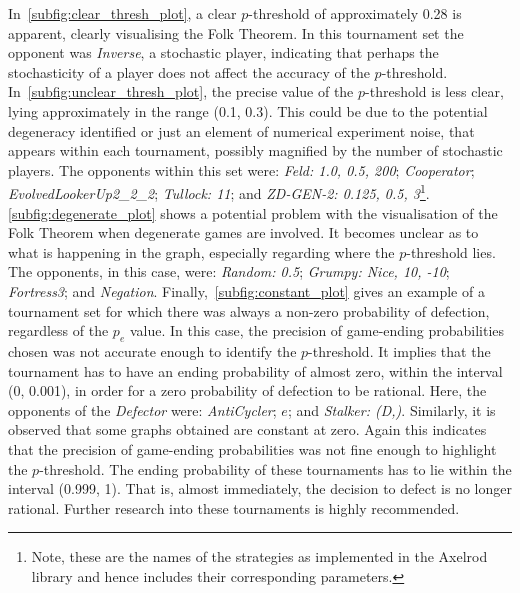 In~\autoref{subfig:clear_thresh_plot}, a clear \(p\)-threshold of approximately
0.28 is apparent, clearly visualising the Folk Theorem. In this tournament set
the opponent was \textit{Inverse}, a stochastic player, indicating that perhaps
the stochasticity of a player does not affect the accuracy of the \(p\)-threshold. In~\autoref{subfig:unclear_thresh_plot}, the precise value of
the \(p\)-threshold is less clear, lying approximately in the range (0.1, 0.3). This
could be due to the potential degeneracy identified or just an element of
numerical experiment noise,
that appears within each tournament, possibly magnified by the number
of stochastic players. The opponents within this set
were: \textit{Feld: 1.0, 0.5, 200}; \textit{Cooperator};
\textit{EvolvedLookerUp2\_2\_2}; \textit{Tullock: 11}; and \textit{ZD-GEN-2:
0.125, 0.5, 3}\footnote{Note, these are the names of the strategies as
implemented in the Axelrod library and hence includes their corresponding parameters.}. \autoref{subfig:degenerate_plot} shows a potential problem
with the visualisation of the Folk Theorem when degenerate games are involved.
It becomes unclear as to what is happening in the graph,
especially regarding where the \(p\)-threshold lies. The opponents, in this case, were:
\textit{Random: 0.5}; \textit{Grumpy: Nice, 10, -10}; \textit{Fortress3}; and
\textit{Negation}. Finally,~\autoref{subfig:constant_plot} gives an example
of a tournament set for which there was always a non-zero probability of
defection, regardless of the \(p_{e}\) value. In this case, the
precision of game-ending probabilities chosen was not accurate enough to
identify the \(p\)-threshold. It implies that the tournament has to have an
ending probability of almost zero, within the interval (0, 0.001), in order for a
zero probability of defection to be rational. Here, the opponents of the
\textit{Defector} were: \textit{AntiCycler}; \textit{\(e\)}; and
\textit{Stalker: (D,)}. Similarly, it is observed that some graphs obtained
are constant at zero. Again this indicates that the precision of game-ending
probabilities was not fine enough to highlight the \(p\)-threshold. The ending probability of these tournaments has to lie within the interval
(0.999, 1). That is, almost immediately, the decision to defect is no longer
rational. Further research into these tournaments is highly recommended.

%    

